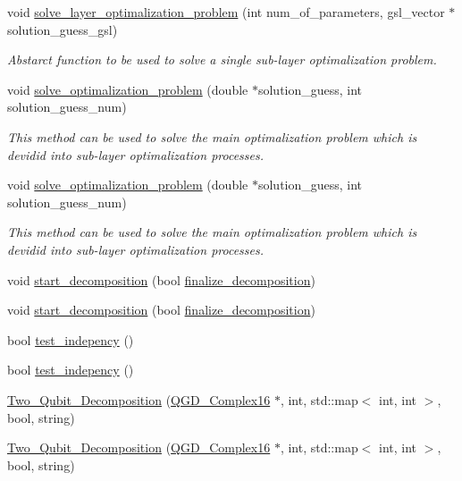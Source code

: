 \begin{DoxyCompactItemize}
void \hyperlink{class_two___qubit___decomposition_a78cd2a6470743e5a8b48f5857e440e52}{solve\+\_\+layer\+\_\+optimalization\+\_\+problem} (int num\+\_\+of\+\_\+parameters, gsl\+\_\+vector $\ast$solution\+\_\+guess\+\_\+gsl)
\begin{DoxyCompactList}\small\item\em Abstarct function to be used to solve a single sub-\/layer optimalization problem. \end{DoxyCompactList}\item 
void \hyperlink{class_decomposition___base_ae21ecd8c5016a6ec942330247e8cdebc}{solve\+\_\+optimalization\+\_\+problem} (double $\ast$solution\+\_\+guess, int solution\+\_\+guess\+\_\+num)
\begin{DoxyCompactList}\small\item\em This method can be used to solve the main optimalization problem which is devidid into sub-\/layer optimalization processes. \end{DoxyCompactList}\item 
void \hyperlink{class_decomposition___base_ae21ecd8c5016a6ec942330247e8cdebc}{solve\+\_\+optimalization\+\_\+problem} (double $\ast$solution\+\_\+guess, int solution\+\_\+guess\+\_\+num)
\begin{DoxyCompactList}\small\item\em This method can be used to solve the main optimalization problem which is devidid into sub-\/layer optimalization processes. \end{DoxyCompactList}\item 
void \hyperlink{class_two___qubit___decomposition_adb63f279cdb5045f88ffdff36220cb94}{start\+\_\+decomposition} (bool \hyperlink{class_decomposition___base_a0cdd12741e72e2c074a188fe3867e6d5}{finalize\+\_\+decomposition})
\item 
void \hyperlink{class_two___qubit___decomposition_adb63f279cdb5045f88ffdff36220cb94}{start\+\_\+decomposition} (bool \hyperlink{class_decomposition___base_a0cdd12741e72e2c074a188fe3867e6d5}{finalize\+\_\+decomposition})
\item 
bool \hyperlink{class_two___qubit___decomposition_a74d29b3b65307a5e460a693d03bca34f}{test\+\_\+indepency} ()
\item 
bool \hyperlink{class_two___qubit___decomposition_a74d29b3b65307a5e460a693d03bca34f}{test\+\_\+indepency} ()
\item 
\hyperlink{class_two___qubit___decomposition_ab34ed87f8c2a53c9b4ddc672b00dcf9d}{Two\+\_\+\+Qubit\+\_\+\+Decomposition} (\hyperlink{struct_q_g_d___complex16}{Q\+G\+D\+\_\+\+Complex16} $\ast$, int, std\+::map$<$ int, int $>$, bool, string)
\item 
\hyperlink{class_two___qubit___decomposition_ab34ed87f8c2a53c9b4ddc672b00dcf9d}{Two\+\_\+\+Qubit\+\_\+\+Decomposition} (\hyperlink{struct_q_g_d___complex16}{Q\+G\+D\+\_\+\+Complex16} $\ast$, int, std\+::map$<$ int, int $>$, bool, string)
\end{DoxyCompactItemize}
